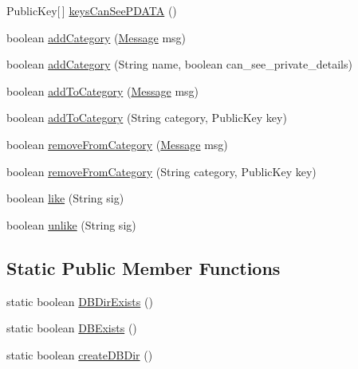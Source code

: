 \begin{DoxyCompactItemize}
\item 
Public\-Key\mbox{[}$\,$\mbox{]} \hyperlink{classballmerpeak_1_1turtlenet_1_1server_1_1Database_acd908d7244665e90b2c852d2bd4d24d8}{keys\-Can\-See\-P\-D\-A\-T\-A} ()
\item 
boolean \hyperlink{classballmerpeak_1_1turtlenet_1_1server_1_1Database_a60f429af2120947b9a6cc06617bb1bea}{add\-Category} (\hyperlink{classballmerpeak_1_1turtlenet_1_1shared_1_1Message}{Message} msg)
\item 
boolean \hyperlink{classballmerpeak_1_1turtlenet_1_1server_1_1Database_a543175382e7c3baf70b684a79c5046d8}{add\-Category} (String name, boolean can\-\_\-see\-\_\-private\-\_\-details)
\item 
boolean \hyperlink{classballmerpeak_1_1turtlenet_1_1server_1_1Database_aca5e259e29216730354cf97b87f1a070}{add\-To\-Category} (\hyperlink{classballmerpeak_1_1turtlenet_1_1shared_1_1Message}{Message} msg)
\item 
boolean \hyperlink{classballmerpeak_1_1turtlenet_1_1server_1_1Database_a92b3b3bea181888c22086688816738aa}{add\-To\-Category} (String category, Public\-Key key)
\item 
boolean \hyperlink{classballmerpeak_1_1turtlenet_1_1server_1_1Database_a2718a68613d43dabf2c62bebc9f41e05}{remove\-From\-Category} (\hyperlink{classballmerpeak_1_1turtlenet_1_1shared_1_1Message}{Message} msg)
\item 
boolean \hyperlink{classballmerpeak_1_1turtlenet_1_1server_1_1Database_a25313e4d456741744541e8b42d7bef9b}{remove\-From\-Category} (String category, Public\-Key key)
\item 
boolean \hyperlink{classballmerpeak_1_1turtlenet_1_1server_1_1Database_ac2c2361722304a6446d5cd01cb0c5d3b}{like} (String sig)
\item 
boolean \hyperlink{classballmerpeak_1_1turtlenet_1_1server_1_1Database_a500911b2c3d32d456c2bf34a23747d85}{unlike} (String sig)
\end{DoxyCompactItemize}
\subsection*{Static Public Member Functions}
\begin{DoxyCompactItemize}
\item 
static boolean \hyperlink{classballmerpeak_1_1turtlenet_1_1server_1_1Database_a89fecb924cc735abbc16d58405945fb2}{D\-B\-Dir\-Exists} ()
\item 
static boolean \hyperlink{classballmerpeak_1_1turtlenet_1_1server_1_1Database_a2001d0b63c21d13d0a023d70f571c5bd}{D\-B\-Exists} ()
\item 
static boolean \hyperlink{classballmerpeak_1_1turtlenet_1_1server_1_1Database_aa21c9f4bf38697e84fe76fee2023be9e}{create\-D\-B\-Dir} ()
\end{DoxyCompactItemize}
